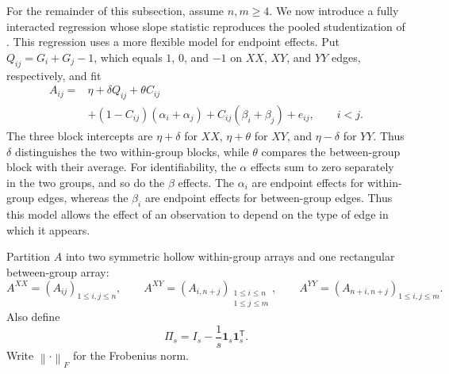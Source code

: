 \documentclass[11pt]{article}
\theoremstyle{plain}
\theoremstyle{definition}
\theoremstyle{remark}
\newcommand{\one}{\mathbf 1}
\newcommand{\norm}[1]{\left\lVert #1\right\rVert}
\begin{document}
For the remainder of this subsection, assume $n,m\ge4$.  We now introduce a
fully interacted regression whose slope statistic
reproduces the pooled studentization of \citet{ChakrabortyZhang2021}.  This
regression uses a more flexible model for endpoint effects.  Put
$Q_{ij}=G_i+G_j-1$, which equals $1$, $0$, and $-1$ on $XX$, $XY$, and $YY$
edges, respectively, and fit
\begin{equation}
 \begin{split}
 A_{ij}={}&\eta+\delta Q_{ij}+\theta C_{ij}\\
 &+(1-C_{ij})(\alpha_i+\alpha_j)
   +C_{ij}(\beta_i+\beta_j)+e_{ij},
 \qquad i<j.
 \end{split}
 \label{eq:stacked-two-sample-edge-model}
\end{equation}
The three block intercepts are $\eta+\delta$ for $XX$, $\eta+\theta$ for
$XY$, and $\eta-\delta$ for $YY$.  Thus $\delta$ distinguishes the two
within-group blocks, while $\theta$ compares the between-group block with
their average.
For identifiability, the $\alpha$ effects sum to zero separately in the two
groups, and so do the $\beta$ effects.  The $\alpha_i$ are endpoint effects
for within-group edges, whereas the $\beta_i$ are endpoint effects for
between-group edges.  Thus this model allows the effect of an observation to
depend on the type of edge in which it appears.

Partition $A$ into two symmetric hollow within-group arrays and one
rectangular between-group array:
\[
 A^{XX}=(A_{ij})_{1\le i,j\le n},\qquad
 A^{XY}=(A_{i,n+j})_{\substack{1\le i\le n\\1\le j\le m}},\qquad
 A^{YY}=(A_{n+i,n+j})_{1\le i,j\le m}.
\]
Also define
\[
 \Pi_s=I_s-\frac1s\one_s\one_s^\mathsf T.
\]
Write $\norm{\cdot}_F$ for the Frobenius norm.
\end{document}
